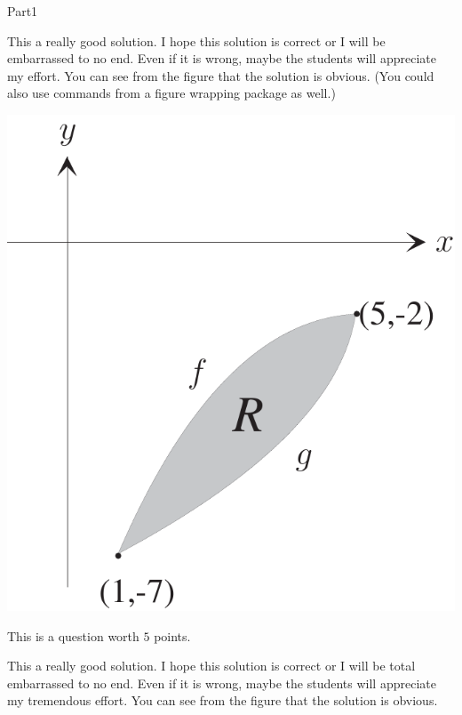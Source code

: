 \documentclass[10pt]{article}
\begin{document}
\begin{exam}[Part I.]{Part1}
\begin{problem}[7]
\begin{solution}[1in]
This a really good  solution. I hope this solution is correct or I will be
embarrassed to no end. Even if it is wrong, maybe the students will appreciate
my effort. You can see from the figure that the solution is obvious.
(You could also use commands from a figure wrapping package as well.)
\end{solution}
\begin{workarea}[\linewidth]{1in}
\hfill\includegraphics[scale=.2]{fig1}
\end{workarea}
\end{problem}

%

\begin{problem}[5]
This is a question worth $5$ points.

\begin{solution}[1.5in]
This a really good  solution. I hope this solution is correct or I will be total
embarrassed to no end. Even if it is wrong, maybe the students will appreciate
my tremendous effort. You can see from the figure that the solution is obvious.
\end{solution}
\end{problem}


\end{exam}
\end{document}

